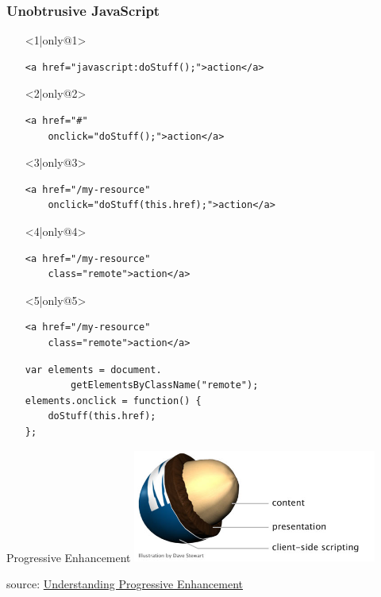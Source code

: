 \documentclass{beamer}
\begin{document}
\begin{frame}[fragile]
  \frametitle{Unobtrusive JavaScript}

  \begin{itemize}
    \item[]<1|only@1> \begin{verbatim}
<a href="javascript:doStuff();">action</a>
    \end{verbatim}
    \item[]<2|only@2> \begin{verbatim}
<a href="#"
    onclick="doStuff();">action</a>
    \end{verbatim}
    \item[]<3|only@3> \begin{verbatim}
<a href="/my-resource"
    onclick="doStuff(this.href);">action</a>
    \end{verbatim}
    \item[]<4|only@4> \begin{verbatim}
<a href="/my-resource"
    class="remote">action</a>
    \end{verbatim}
    \item[]<5|only@5> \begin{verbatim}
<a href="/my-resource"
    class="remote">action</a>
    \end{verbatim}
    \vspace*{0.25cm}
    \begin{verbatim}
var elements = document.
        getElementsByClassName("remote");
elements.onclick = function() {
    doStuff(this.href);
};
    \end{verbatim}
  \end{itemize}
\end{frame}

\begin{frame}{Progressive Enhancement}
  \vspace*{1cm}
  \center \includegraphics[width=8cm]{images/peanut.jpg}

  \vspace*{1cm}
  \tiny source: \href{http://www.alistapart.com/articles/understandingprogressiveenhancement/}{Understanding Progressive Enhancement}
\end{frame}
\end{document}
